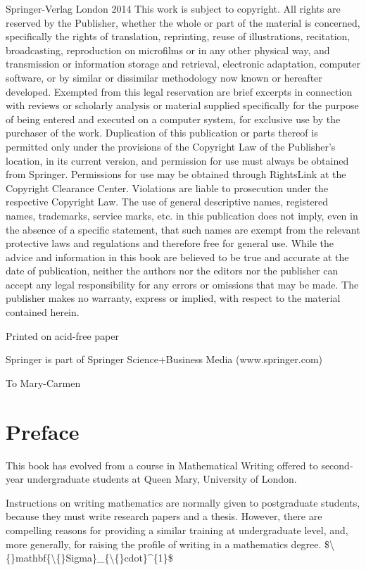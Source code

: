 \documentclass[11pt]{article}
\theoremstyle{plain}
\theoremstyle{definition}
\begin{document}
Springer-Verlag London 2014 This work is subject to copyright. All rights are reserved by the Publisher, whether the whole or part of the material is concerned, specifically the rights of translation, reprinting, reuse of illustrations, recitation, broadcasting, reproduction on microfilms or in any other physical way, and transmission or information storage and retrieval, electronic adaptation, computer software, or by similar or dissimilar methodology now known or hereafter developed. Exempted from this legal reservation are brief excerpts in connection with reviews or scholarly analysis or material supplied specifically for the purpose of being entered and executed on a computer system, for exclusive use by the purchaser of the work. Duplication of this publication or parts thereof is permitted only under the provisions of the Copyright Law of the Publisher's location, in its current version, and permission for use must always be obtained from Springer. Permissions for use may be obtained through RightsLink at the Copyright Clearance Center. Violations are liable to prosecution under the respective Copyright Law. The use of general descriptive names, registered names, trademarks, service marks, etc. in this publication does not imply, even in the absence of a specific statement, that such names are exempt from the relevant protective laws and regulations and therefore free for general use. While the advice and information in this book are believed to be true and accurate at the date of publication, neither the authors nor the editors nor the publisher can accept any legal responsibility for any errors or omissions that may be made. The publisher makes no warranty, express or implied, with respect to the material contained herein.

Printed on acid-free paper

Springer is part of Springer Science+Business Media (www.springer.com)

To Mary-Carmen

\section{Preface}

This book has evolved from a course in Mathematical Writing offered to second-year undergraduate students at Queen Mary, University of London.

Instructions on writing mathematics are normally given to postgraduate students, because they must write research papers and a thesis. However, there are compelling reasons for providing a similar training at undergraduate level, and, more generally, for raising the profile of writing in a mathematics degree. \$\textbackslash\{\}mathbf\{\textbackslash\{\}Sigma\}\_\{\textbackslash\{\}cdot\}\textasciicircum{}\{1\}\$
\end{document}

